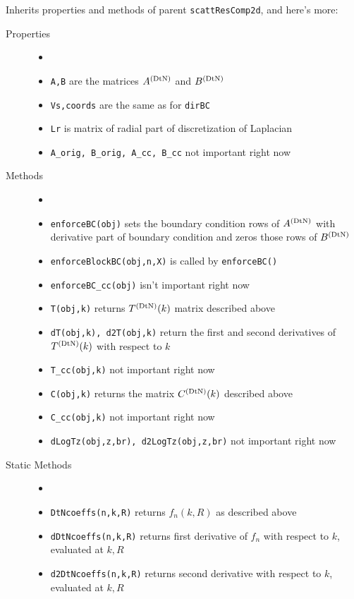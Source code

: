 Inherits properties and methods of parent {\tt scattResComp2d}, and
here's more:
\begin{description}
 \item[Properties]
   \begin{itemize}
    \item[]
    \item {\tt A,B} are the matrices $A^{(\text{DtN})}$ and $B^{(\text{DtN})}$
    \item {\tt Vs,coords} are the same as for {\tt dirBC}
    \item {\tt Lr} is matrix of radial part of discretization of Laplacian
    \item {\tt A\_orig, B\_orig, A\_cc, B\_cc} not important right now 
   \end{itemize}
 \item[Methods]
   \begin{itemize}
    \item[]
    \item {\tt enforceBC(obj)} sets the boundary condition 
          rows of $A^{(\text{DtN})}$ with derivative part of boundary condition
          and zeros those rows of $B^{(\text{DtN})}$
    \item {\tt enforceBlockBC(obj,n,X)}
          is called by {\tt enforceBC()}
    \item {\tt enforceBC\_cc(obj)} isn't important right now
    \item {\tt T(obj,k)} returns $T^{(\text{DtN})}(k)$ matrix described above
    \item {\tt dT(obj,k), d2T(obj,k)} return the first and second
          derivatives of $T^{(\text{DtN})}(k)$ with respect to $k$
    \item {\tt T\_cc(obj,k)} not important right now
    \item {\tt C(obj,k)} returns the matrix $C^{(\text{DtN})}(k)$ described above
    \item {\tt C\_cc(obj,k)} not important right now
    \item {\tt dLogTz(obj,z,br), d2LogTz(obj,z,br)} not important right now
   \end{itemize}
 \item[Static Methods]
   \begin{itemize}
    \item[]
    \item {\tt DtNcoeffs(n,k,R)} returns $f_n(k,R)$ as described above
    \item {\tt dDtNcoeffs(n,k,R)} returns first derivative of $f_n$ with
          respect to $k$, evaluated at $k,R$
    \item {\tt d2DtNcoeffs(n,k,R)} returns second derivative with respect
          to $k$, evaluated at $k,R$
   \end{itemize}    
\end{description}


